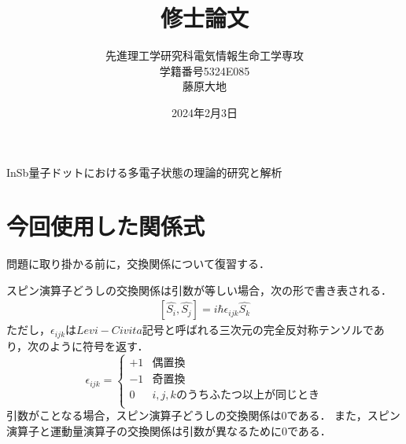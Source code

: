 \documentclass{article}
\title{修士論文}
\author{先進理工学研究科電気情報生命工学専攻\\学籍番号5324E085 \\藤原大地\\}
\date{2024年2月3日}
\begin{document}
\maketitle

InSb量子ドットにおける多電子状態の理論的研究と解析

\newpage

\section{今回使用した関係式}
問題に取り掛かる前に，交換関係について復習する．

スピン演算子どうしの交換関係は引数が等しい場合，次の形で書き表される．
\begin{equation}
\begin{split}
\label{}
[\hat{S_i},\hat{S_j}]=i\hbar \epsilon_{ijk} \hat{S_k}
\end{split}
\end{equation}
ただし，$\epsilon_{ijk}$は$Levi-Civita記号$と呼ばれる三次元の完全反対称テンソルであり，次のように符号を返す．
\begin{equation}  \label{eq: cases f}
    \epsilon_{ijk}=
        \begin{cases}
            +1   &   偶置換  \\
            -1        &  奇置換    \\
            0        &   i,j,kのうちふたつ以上が同じとき    \\
        \end{cases}
    \end{equation}
引数がことなる場合，スピン演算子どうしの交換関係は0である．
また，スピン演算子と運動量演算子の交換関係は引数が異なるために0である．
\end{document}
